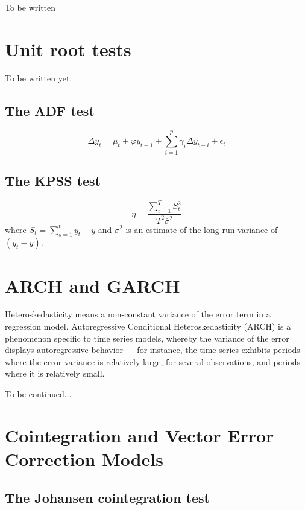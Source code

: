 To be written

\section{Unit root tests}
\label{sec:uroot}

To be written yet.

\subsection{The ADF test}
\label{sec:ADFtest}
\begin{equation}
  \label{eq:ADFtest}
  \Delta y_t = \mu_t + \varphi y_{t-1} + \sum_{i=1}^p \gamma_i \Delta
  y_{t-i} + \epsilon_t
\end{equation}

\subsection{The KPSS test}
\label{sec:KPSStest}

\begin{equation}
  \label{eq:KPSStest}
  \eta = \frac{\sum_{i=1}^T S_t^2 }{ T^2 \bar{\sigma}^2 }
\end{equation}
where $S_t = \sum_{s=1}^t y_t - \bar{y}$ and $\bar{\sigma}^2$ is an
estimate of the long-run variance of $(y_t - \bar{y})$.

\section{ARCH and GARCH}
\label{sec:arch}

Heteroskedasticity means a non-constant variance of the error term in
a regression model.  Autoregressive Conditional Heteroskedasticity
(ARCH) is a phenomenon specific to time series models, whereby the
variance of the error displays autoregressive behavior --- for
instance, the time series exhibits periods where the error variance is
relatively large, for several observations, and periods where it is
relatively small.

To be continued...

\section{Cointegration and Vector Error Correction Models}
\label{vecm-explanation}

\subsection{The Johansen cointegration test}
\label{johansen-test}

